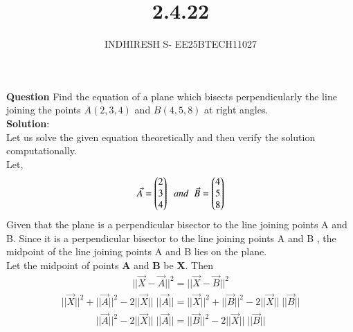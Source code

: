 \documentclass[journal]{IEEEtran}
\theoremstyle{remark}
\begin{document}

\onecolumn

\title{2.4.22}
\author{INDHIRESH S- EE25BTECH11027}
\maketitle


\renewcommand{\thefigure}{\theenumi}
\renewcommand{\thetable}{\theenumi}

\textbf{Question}  Find the equation of a plane which bisects perpendicularly the line joining the points $A(2, 3, 4)$ and $B(4, 5, 8)$ at right angles.\\
\textbf{Solution}:\\
Let us solve the given equation theoretically and then verify the solution computationally. \\
Let,
\begin{align}
    \Vec{A}=\begin{pmatrix}2\\3\\4\end{pmatrix}\;\;and\;\;\Vec{B}=\begin{pmatrix}4\\5\\8\end{pmatrix}
\end{align}
Given that the plane is a perpendicular bisector to the line joining points A and B. Since it is a perpendicular bisector to the line joining points A and B , the midpoint of the line joining points A and B lies on the plane.\\
Let the midpoint of points \textbf{A} and \textbf{B} be \textbf{X}. Then
\begin{align}
||\Vec{X}-\Vec{A}||^2=||\Vec{X}-\Vec{B}||^2
\end{align}
\begin{align}
    ||\Vec{X}||^2+||\Vec{A}||^2-2||\Vec{X}||\;||\Vec{A}||= ||\Vec{X}||^2+||\Vec{B}||^2-2||\Vec{X}||\;||\Vec{B}||
\end{align}
\begin{align}
    ||\Vec{A}||^2-2||\Vec{X}||\;||\Vec{A}||=||\Vec{B}||^2-2||\Vec{X}||\;||\Vec{B}||
\end{align}
\end{document}
